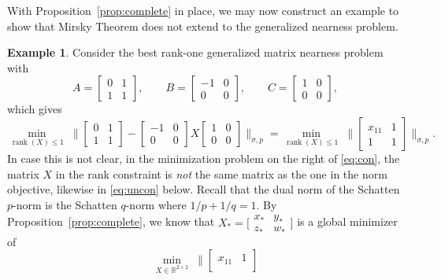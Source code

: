 \documentclass[11pt,reqno]{amsart}
\newcommand{\st}{\sigma}
\DeclareMathOperator{\rank}{rank}
\theoremstyle{definition}
\newtheorem{example}[theorem]{Example}
\numberwithin{equation}{section}
\newcommand{\R}{\mathbb{R}}
\begin{document}
With Proposition~\ref{prop:complete} in place, we may now construct an example to show that Mirsky Theorem \cite[Theorem~2]{mir} does not extend to the generalized nearness problem.
\begin{example}\label{example:completion}
Consider the best rank-one generalized matrix nearness problem with
\[
A = \begin{bmatrix}
    0 &1 \\
    1 &1
\end{bmatrix}, \qquad B = \begin{bmatrix}
    -1 &0 \\0 &0
\end{bmatrix}, \qquad C = \begin{bmatrix}
    1 &0 \\0 &0
\end{bmatrix},
\]
which gives\
\begin{equation}\label{eq:con}
\min_{\rank(X) \le 1} \; \biggl\lVert \begin{bmatrix}
    0 & 1 \\
    1 & 1
\end{bmatrix} - \begin{bmatrix}
    -1 &0 \\0 &0
\end{bmatrix} X \begin{bmatrix}
    1 & 0 \\0 &0
\end{bmatrix}\biggr\rVert_{\st, p} = \min_{\rank(X) \le 1} \; \biggl\lVert \begin{bmatrix}
    x_{11} & 1 \\
    1 & 1
\end{bmatrix} \biggr\rVert_{\st, p}.
\end{equation}
In case this is not clear, in the minimization problem on the right of \eqref{eq:con}, the matrix $X$ in the rank constraint is \emph{not} the same matrix as the one in the norm objective, likewise in \eqref{eq:uncon} below. 
Recall that the dual norm of the Schatten $p$-norm is the Schatten $q$-norm where $1/p+1/q=1$. By Proposition~\ref{prop:complete}, we know that $X_*  = \bigl[\begin{smallmatrix}
x_* & y_* \\
z_* & w_*
\end{smallmatrix} \bigr]$ is a global minimizer of
\begin{equation}\label{eq:uncon}
\min_{X \in \R^{2 \times 2}} \; \biggl\lVert \begin{bmatrix}
    x_{11} & 1 \\

\end{bmatrix}
\end{equation}
\end{example}
\end{document}
